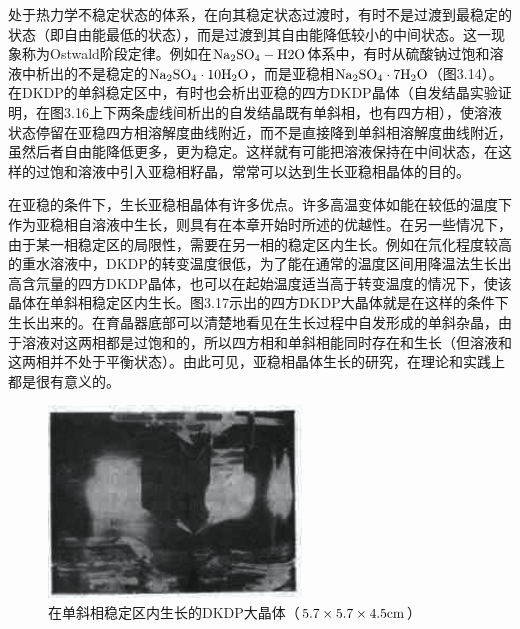 处于热力学不稳定状态的体系，在向其稳定状态过渡时，有时不是过渡到最稳定的状态（即自由能最低的状态），而是过渡到其自由能降低较小的中间状态。这一现象称为Ostwald阶段定律。例如在$\rm Na_2SO_4-H2O$体系中，有时从硫酸钠过饱和溶液中析出的不是稳定的$\rm Na_2SO_4\cdot 10H_2O$，而是亚稳相$\rm Na_2SO_4\cdot 7H_2O$（图3.14）。在DKDP的单斜稳定区中，有时也会析出亚稳的四方DKDP晶体（自发结晶实验证明，在图3.16上下两条虚线间析出的自发结晶既有单斜相，也有四方相），使溶液状态停留在亚稳四方相溶解度曲线附近，而不是直接降到单斜相溶解度曲线附近，虽然后者自由能降低更多，更为稳定。这样就有可能把溶液保持在中间状态，在这样的过饱和溶液中引入亚稳相籽晶，常常可以达到生长亚稳相晶体的目的。

在亚稳的条件下，生长亚稳相晶体有许多优点。许多高温变体如能在较低的温度下作为亚稳相自溶液中生长，则具有在本章开始时所述的优越性。在另一些情况下，由于某一相稳定区的局限性，需要在另一相的稳定区内生长。例如在氘化程度较高的重水溶液中，DKDP的转变温度很低，为了能在通常的温度区间用降温法生长出高含氘量的四方DKDP晶体，也可以在起始温度适当高于转变温度的情况下，使该晶体在单斜相稳定区内生长。图3.17示出的四方DKDP大晶体就是在这样的条件下生长出来的。在育晶器底部可以清楚地看见在生长过程中自发形成的单斜杂晶，由于溶液对这两相都是过饱和的，所以四方相和单斜相能同时存在和生长（但溶液和这两相并不处于平衡状态）。由此可见，亚稳相晶体生长的研究，在理论和实践上都是很有意义的。

\begin{figure}[h]
 \centering
 \includegraphics[width=0.6\textwidth]{fig/cp03/img3.17.jpg}
 \caption{在单斜相稳定区内生长的DKDP大晶体（$\rm 5.7\times 5.7\times 4.5cm$）}
\end{figure}

